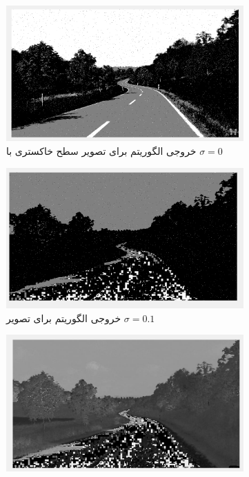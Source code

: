 \documentclass[11.5pt,a4paper]{article}
\begin{document}
\begin{figure}[h]
\center
	\begin{subfigure}{0.4\textwidth}
	\includegraphics[scale=0.2]{Imgs/iter9_Gray_Classification.png}
	\caption{خروجی الگوریتم برای تصویر سطح خاکستری با $\sigma=0$}
	\end{subfigure}
	\begin{subfigure}{0.4\textwidth}
	\includegraphics[scale=0.2]{Imgs/MRF_H_Iter9.png}
	\caption{خروجی الگوریتم برای تصویر  $\sigma=0.1$}
	\end{subfigure}	
	\begin{subfigure}{0.4\textwidth}
	\includegraphics[scale=0.2]{Imgs/MRF_H.png}

\end{subfigure}
\end{figure}
\end{document}
